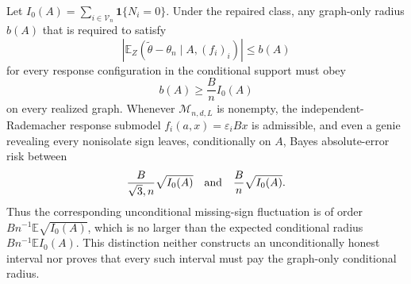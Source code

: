 Let \(I_0(A)=\sum_{i\in\mathcal V_n}\mathbf1\{N_i=0\}\).  Under the repaired class, any graph-only radius \(b(A)\) that is required to satisfy
\[
 \left|\mathbb E_Z(\widetilde\theta-\theta_n\mid A,(f_i)_i)\right|\leq b(A)
\]
for every response configuration in the conditional support must obey
\[
 b(A)\geq \frac{B}{n}I_0(A)
\]
on every realized graph.  Whenever \(\mathcal M_{n,d,L}\) is nonempty, the independent-Rademacher response submodel \(f_i(a,x)=\varepsilon_iBx\) is admissible, and even a genie revealing every nonisolate sign leaves, conditionally on \(A\), Bayes absolute-error risk between
\[
 \frac{B}{\sqrt3,n}\sqrt{I_0(A)}
 \quad\hbox{and}\quad
 \frac{B}{n}\sqrt{I_0(A)}.
\]
Thus the corresponding unconditional missing-sign fluctuation is of order \(Bn^{-1}\mathbb E\sqrt{I_0(A)}\), which is no larger than the expected conditional radius \(Bn^{-1}\mathbb E I_0(A)\).  This distinction neither constructs an unconditionally honest interval nor proves that every such interval must pay the graph-only conditional radius.